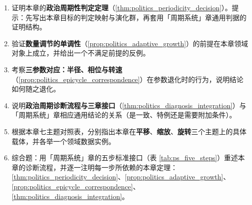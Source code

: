 \begin{enumerate}[leftmargin=3em, label=\textbf{题 \arabic*}]
    \item 证明本章的\textbf{政治周期性判定定理}（\ref{thm:politics_periodicity_decision}）。提示：先写出本章目标的判定映射与演化群，再套用「周期系统」章通用判据的证明结构。

    \item 验证\textbf{数量调节的单调性}（\ref{prop:politics_adaptive_growth}）的前提在本章领域对象上成立，并给出一个不满足前提的反例。

    \item 考察\textbf{三参数对应：半径、相位与转速}（\ref{prop:politics_epicycle_correspondence}）在参数退化时的行为，说明结论如何随之退化。

    \item 说明\textbf{政治周期诊断流程与三章接口}（\ref{thm:politics_diagnosis_integration}）与「周期系统」章相应通用结论的关系（是一致、特例还是需要附加条件）。

    \item 根据本章七主题对照表，分别指出本章在\textbf{平移}、\textbf{缩放}、\textbf{旋转}三个主题上的具体载体，并各举一个领域数据实例。

    \item 综合题：用「周期系统」章的五步标准接口（表 \ref{tab:ps_five_steps}）重述本章的诊断流程，并逐一注明每一步所依赖的本章定理：\ref{thm:politics_periodicity_decision}、\ref{prop:politics_adaptive_growth}、\ref{prop:politics_epicycle_correspondence}、\ref{thm:politics_diagnosis_integration}。
\end{enumerate}



